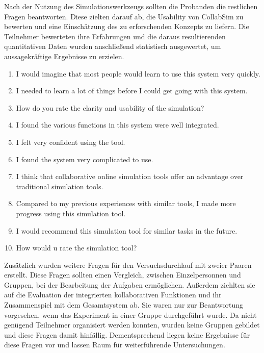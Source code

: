 \documentclass[german,version-2020-11]{uzl-thesis}
\begin{document}
  Nach der Nutzung des Simulationswerkzeugs sollten die Probanden die restlichen Fragen beantworten. 
  Diese zielten darauf ab, die Usability von CollabSim zu bewerten und eine Einschätzung des zu erforschenden Konzepts zu liefern.
  Die Teilnehmer bewerteten ihre Erfahrungen und die daraus resultierenden quantitativen Daten wurden anschließend statistisch ausgewertet, um aussagekräftige Ergebnisse zu erzielen.
  
  \begin{enumerate}
    \item 
    I would imagine that most people would learn to use this system very quickly. %
    \item
    I needed to learn a lot of things before I could get going with this system. %
    \item
    How do you rate the clarity and usability of the simulation? %
    \item
    I found the various functions in this system were well integrated. %
    \item
    I felt very confident using the tool. %
    \item
    I  found the system very complicated to use. %
    \item
    I think that collaborative online simulation tools offer an advantage over traditional simulation tools. %
    \item
    Compared to my previous experiences with similar tools, I made more progress using this simulation tool. %
    \item
    I would recommend this simulation tool for similar tasks in the future. %
    \item
    How would u rate the simulation tool? %
    \end{enumerate}



  Zusätzlich wurden weitere Fragen für den Versuchsdurchlauf mit zweier Paaren erstellt. 
  Diese Fragen sollten einen Vergleich, zwischen Einzelpersonnen und Gruppen, bei der Bearbeitung der Aufgaben ermöglichen.
  Außerdem ziehlten sie auf die Evaluation der integrierten kollaborativen Funktionen und ihr Zusammenspiel mit dem Gesamtsystem ab. 
  Sie waren nur zur Beantwortung vorgesehen, wenn das Experiment in einer Gruppe durchgeführt wurde. 
  Da nicht genügend Teilnehmer organisiert werden konnten, wurden keine Gruppen gebildet und diese Fragen damit hinfällig.
  Dementsprechend liegen keine Ergebnisse für diese Fragen vor und lassen Raum für weiterführende Untersuchungen.
\end{document}
